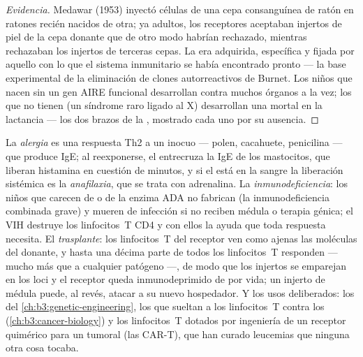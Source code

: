 \begin{proof}[Evidencia]
Medawar (1953) inyectó células de una cepa consanguínea de ratón en
ratones recién nacidos de otra; ya adultos, los receptores aceptaban
injertos de piel de la cepa donante que de otro modo habrían rechazado,
mientras rechazaban los injertos de terceras cepas. La  era
adquirida, específica y fijada por aquello con lo que el sistema
inmunitario se había encontrado pronto --- la base experimental de la
eliminación de clones autorreactivos de Burnet. Los niños que nacen sin
un gen AIRE funcional desarrollan  contra muchos órganos a
la vez; los que no tienen  (un síndrome raro ligado al X)
desarrollan una  mortal en la lactancia --- los dos brazos
de la , mostrado cada uno por su ausencia.
\end{proof}

\begin{example}\label{ex:b3:adaptive-immunity:failures}
La \emph{alergia} es una respuesta Th2 a un  inocuo --- polen,
cacahuete, penicilina --- que produce IgE; al reexponerse, el 
entrecruza la IgE de los mastocitos, que liberan histamina en cuestión de
minutos, y si el  está en la sangre la liberación sistémica es la
\emph{anafilaxia}, que se trata con adrenalina. La
\emph{inmunodeficiencia}: los niños que carecen de  o de la enzima ADA
no fabrican  (la inmunodeficiencia combinada grave) y mueren de
infección si no reciben médula o terapia génica; el VIH destruye los
linfocitos~T CD4 y con ellos la ayuda que toda respuesta necesita. El
\emph{trasplante}: los linfocitos~T del receptor ven como ajenas las
moléculas  del donante, y hasta una décima parte de todos los
linfocitos~T responden --- mucho más que a cualquier patógeno ---, de
modo que los injertos se emparejan en los loci  y el receptor queda
inmunodeprimido de por vida; un injerto de médula puede, al revés,
atacar a su nuevo hospedador. Y los usos deliberados: los  del \cref{ch:b3:genetic-engineering}, los  que sueltan a los linfocitos~T contra los 
(\cref{ch:b3:cancer-biology}) y los linfocitos~T dotados por ingeniería
de un receptor quimérico para un  tumoral (las CAR-T), que han
curado leucemias que ninguna otra cosa tocaba.
\end{example}

